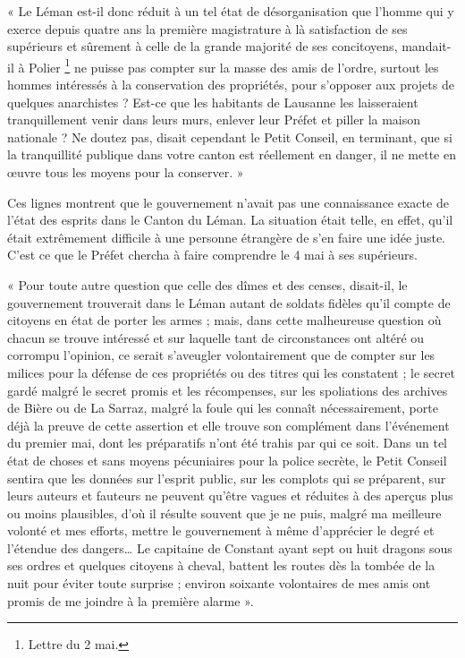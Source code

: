 \documentclass[french,twoside]{book} %
\newenvironment{quoteblock}%
  {\begin{quoting}}
  {\end{quoting}}
\newenvironment{quotebar}{%
    \def\FrameCommand{{\color{rubric!10!}\vrule width 0.5em} \hspace{0.9em}}%
    \def\OuterFrameSep{\itemsep} %
    \MakeFramed {\advance\hsize-\width \FrameRestore}
  }%
  {%
    \endMakeFramed
  }
\renewenvironment{quoteblock}%
  {%
    \savenotes
    \setstretch{0.9}
    \begin{quotebar}
  }
  {%
    \end{quotebar}
    \spewnotes
  }
\begin{document}
\begin{quoteblock}
\noindent « Le Léman est-il donc réduit à un tel état de désorganisation que l’homme qui y exerce depuis quatre ans la première magistrature à là satisfaction de ses supérieurs et sûrement à celle de la grande majorité de ses concitoyens, mandait-il à Polier \footnote{Lettre du 2 mai.} ne puisse pas compter sur la masse des amis de l’ordre, surtout les hommes intéressés à la conservation des propriétés, pour s’opposer aux projets de quelques anarchistes ? Est-ce que les habitants de Lausanne les laisseraient tranquillement venir dans leurs murs, enlever leur Préfet et piller la maison nationale ? Ne doutez pas, disait cependant le Petit Conseil, en terminant, que si la tranquillité publique dans votre canton est réellement en danger, il ne mette en œuvre tous les moyens pour la conserver. »\end{quoteblock}

\noindent Ces lignes montrent que le gouvernement n’avait pas une connaissance exacte de l’état des esprits dans le Canton du Léman. La situation était telle, en effet, qu’il était extrêmement difficile à une personne étrangère de s’en faire une idée juste. C’est ce que le Préfet chercha à faire comprendre le 4 mai à ses supérieurs.\par

\begin{quoteblock}
 \noindent « Pour toute autre question que celle des dîmes et des censes, disait-il, le gouvernement trouverait dans le Léman autant de soldats fidèles qu’il compte de citoyens en état de porter les armes ; mais, dans cette malheureuse question où chacun se trouve intéressé et sur laquelle tant de circonstances ont altéré ou corrompu l’opinion, ce serait s’aveugler volontairement que de compter sur les milices pour la défense de ces propriétés ou des titres qui les constatent ; le secret gardé malgré le secret promis et les récompenses, sur les spoliations des archives de Bière ou de La Sarraz, malgré la foule qui les connaît nécessairement, porte déjà la preuve de cette assertion et elle trouve son complément dans l’événement du premier mai, dont les préparatifs n’ont été trahis par qui ce soit. Dans un tel état de choses et sans moyens pécuniaires pour la police secrète, le Petit Conseil sentira que les données sur l’esprit public, sur les complots qui se préparent, sur leurs auteurs et fauteurs ne peuvent qu’être vagues et réduites à des aperçus plus ou moins plausibles, d’où il résulte souvent que je ne puis, malgré ma meilleure volonté et mes efforts, mettre le gouvernement à même d’apprécier le degré et l’étendue des dangers… Le capitaine de Constant ayant sept ou huit dragons sous ses ordres et quelques citoyens à cheval, battent les routes dès la tombée de la nuit pour éviter toute surprise ; environ soixante volontaires de mes amis ont promis de me joindre à la première alarme ».
 \end{quoteblock}
\end{document}
